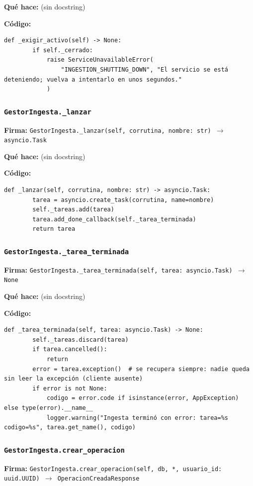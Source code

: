 \documentclass[11pt,a4paper]{article}
\begin{document}
\textbf{Qué hace:} (sin docstring)

\textbf{Código:}
\begin{lstlisting}
def _exigir_activo(self) -> None:
        if self._cerrado:
            raise ServiceUnavailableError(
                "INGESTION_SHUTTING_DOWN", "El servicio se está deteniendo; vuelva a intentarlo en unos segundos."
            )
\end{lstlisting}

\subsubsection*{\texttt{GestorIngesta.\_lanzar}}
\textbf{Firma:} \texttt{GestorIngesta.\_lanzar(self, corrutina, nombre: str) $\rightarrow$ asyncio.Task}

\textbf{Qué hace:} (sin docstring)

\textbf{Código:}
\begin{lstlisting}
def _lanzar(self, corrutina, nombre: str) -> asyncio.Task:
        tarea = asyncio.create_task(corrutina, name=nombre)
        self._tareas.add(tarea)
        tarea.add_done_callback(self._tarea_terminada)
        return tarea
\end{lstlisting}

\subsubsection*{\texttt{GestorIngesta.\_tarea\_terminada}}
\textbf{Firma:} \texttt{GestorIngesta.\_tarea\_terminada(self, tarea: asyncio.Task) $\rightarrow$ None}

\textbf{Qué hace:} (sin docstring)

\textbf{Código:}
\begin{lstlisting}
def _tarea_terminada(self, tarea: asyncio.Task) -> None:
        self._tareas.discard(tarea)
        if tarea.cancelled():
            return
        error = tarea.exception()  # se recupera siempre: nadie queda sin leer la excepción (cliente ausente)
        if error is not None:
            codigo = error.code if isinstance(error, AppException) else type(error).__name__
            logger.warning("Ingesta terminó con error: tarea=%s codigo=%s", tarea.get_name(), codigo)
\end{lstlisting}

\subsubsection*{\texttt{GestorIngesta.crear\_operacion}}
\textbf{Firma:} \texttt{GestorIngesta.crear\_operacion(self, db, *, usuario\_id: uuid.UUID) $\rightarrow$ OperacionCreadaResponse}
\end{document}

